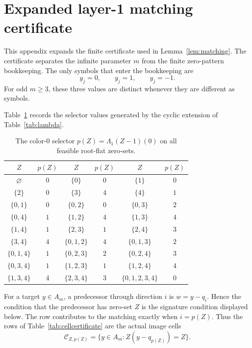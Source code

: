 \documentclass[11pt]{article}
\theoremstyle{definition}
\begin{document}
\appendix

\section{Expanded layer-1 matching certificate}\label{app:matching-certificate}

This appendix expands the finite certificate used in Lemma~\ref{lem:matching}.  The certificate
separates the infinite parameter \(m\) from the finite zero-pattern bookkeeping.  The only symbols
that enter the bookkeeping are
\[
 y_j=0,\qquad y_j=1,\qquad y_j=-1.
\]
For odd \(m\ge3\), these three values are distinct whenever they are different as symbols.

Table~\ref{tab:selector} records the selector values generated by the cyclic extension of Table~\ref{tab:lambda}.


\begin{table}[h]
\centering
\caption{The color-0 selector \(p(Z)=\Lambda_1(Z-1)(0)\) on all feasible root-flat zero-sets.}\label{tab:selector}
\small
\begin{tabular}{c c@{\qquad}c c@{\qquad}c c}
\toprule
\(Z\) & \(p(Z)\) & \(Z\) & \(p(Z)\) & \(Z\) & \(p(Z)\) \\
\midrule
$\varnothing$ & $0$ & $\{0\}$ & $0$ & $\{1\}$ & $0$ \\
$\{2\}$ & $0$ & $\{3\}$ & $4$ & $\{4\}$ & $1$ \\
$\{0,1\}$ & $0$ & $\{0,2\}$ & $0$ & $\{0,3\}$ & $2$ \\
$\{0,4\}$ & $1$ & $\{1,2\}$ & $4$ & $\{1,3\}$ & $4$ \\
$\{1,4\}$ & $1$ & $\{2,3\}$ & $1$ & $\{2,4\}$ & $3$ \\
$\{3,4\}$ & $4$ & $\{0,1,2\}$ & $4$ & $\{0,1,3\}$ & $2$ \\
$\{0,1,4\}$ & $1$ & $\{0,2,3\}$ & $2$ & $\{0,2,4\}$ & $3$ \\
$\{0,3,4\}$ & $1$ & $\{1,2,3\}$ & $1$ & $\{1,2,4\}$ & $4$ \\
$\{1,3,4\}$ & $4$ & $\{2,3,4\}$ & $3$ & $\{0,1,2,3,4\}$ & $0$ \\
\bottomrule
\end{tabular}
\end{table}

For a target \(y\in A_m\), a predecessor through direction \(i\) is \(w=y-q_i\).  Hence the condition
that the predecessor has zero-set \(Z\) is the signature condition displayed below.  The row contributes
to the matching exactly when \(i=p(Z)\).  Thus the rows of Table~\ref{tab:cellcertificate} are the
actual image cells
\[
\mathcal C_{Z,p(Z)}=\{y\in A_m: Z(y-q_{p(Z)})=Z\}.
\]
\end{document}
